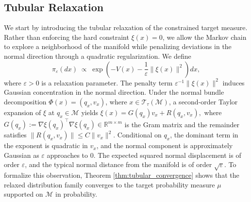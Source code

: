\documentclass[12pt]{article}
\begin{document}
\subsection{Tubular Relaxation}
We start by introducing the tubular relaxation of
the constrained target measure.
Rather than enforcing the hard constraint $\xi(x)=0$,
we allow the Markov chain to explore a neighborhood of the manifold
while penalizing deviations in the normal direction through a quadratic
regularization. We define
\begin{equation}
\label{eq:tubular_relaxation}
\pi_\varepsilon(dx)
\;\propto\;
\exp\!\left(
- V(x)
- \frac{1}{\varepsilon}\|\xi(x)\|^2
\right) dx,
\end{equation}
where $\varepsilon>0$ is a relaxation parameter.
The penalty term $\varepsilon^{-1}\|\xi(x)\|^2$
induces Gaussian concentration in the normal direction.
Under the normal bundle decomposition $\Phi(x)=(q_x,v_x)$,
where $x \in \mathcal{T}_\tau(\mathcal{M})$,
a second-order Taylor expansion of $\xi$ at $q_x \in \mathcal M$
yields
\(
\xi(x)
=
G(q_x) v_x
+
R(q_x,v_x),
\)
where $G(q_x):=\nabla \xi(q_x)^\top\nabla\xi(q_x)\in \mathbb{R}^{m\times m}$ is the Gram matrix and the remainder satisfies
$ \|R(q_x,v_x)\| \le C \|v_x\|^2 $.
Conditional on $q_x$, the dominant term in the exponent is quadratic in $v_x$,
and the normal component is approximately Gaussian as $\varepsilon$ approaches to 0. The expected squared normal displacement is of order $\varepsilon$,
and the typical normal distance from the manifold is of order
$\sqrt{\varepsilon}$. To formalize this observation, Theorem \ref{thm:tubular_convergence} shows that the relaxed distribution family converges to the target probability measure $\mu$ supported on $\mathcal{M}$ in probability. 
\end{document}
